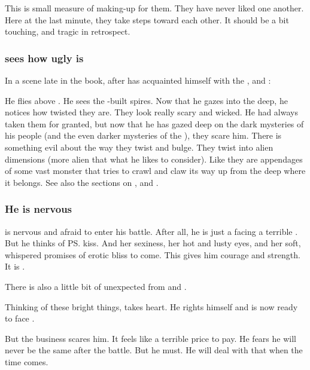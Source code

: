 This is small measure of making-up for them. 
They have never liked one another.
Here at the last minute, they take steps toward each other. 
It should be a bit touching, and tragic in retrospect. 





\subsubsection{\Teshrial sees how ugly \Nyx is}
In a scene late in the book, after \Teshrial has acquainted himself with the \noggyaleth, \neoresphain and \WanderersInDarknessEmph:
  
He flies above \Nyx.
He sees the \bane-built spires. 
Now that he gazes into the deep, he notices how twisted they are.
They look really scary and wicked.
He had always taken them for granted, but now that he has gazed deep on the dark mysteries of his people (and the even darker mysteries of the \banes), they scare him.
There is something evil about the way they twist and bulge.
They twist into alien dimensions (more alien that what he likes to consider). 
Like they are appendages of some vast monster that tries to crawl and claw its way up from the deep where it belongs. 
See also the sections on ,  and . 





\subsubsection{He is nervous}
\Teshrial{} is nervous and afraid to enter his battle. 
After all, he is just a \ketheran{} facing a terrible \shaeeroth. 
But he thinks of \ps{\Firaxel} kiss. 
And her sexiness, her hot and lusty eyes, and her soft, whispered promises of erotic bliss to come. 
This gives him courage and strength. 
It is . 

There is also a little bit of unexpected  from \Achsah and \Urizeth. 

Thinking of these bright things, \Teshrial{} takes heart. 
He rights himself and is now ready to face \Ishnaruchaefir. 

But the \neoresphan business scares him. 
It feels like a terrible price to pay.
He fears he will never be the same after the battle. 
But he must.
He will deal with that when the time comes. 









